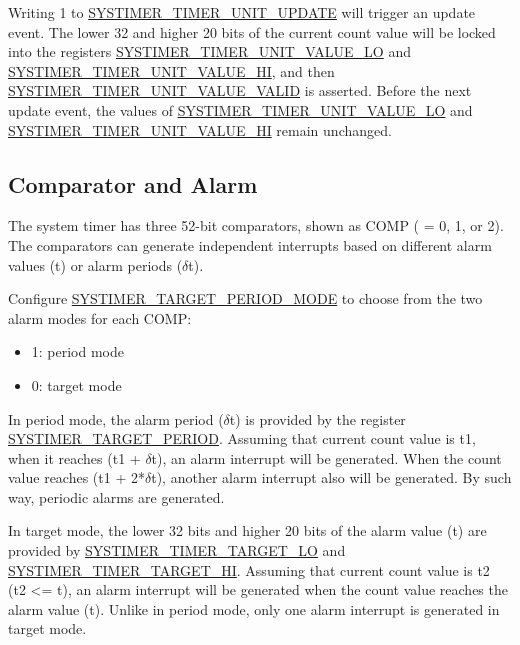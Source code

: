 \documentclass[main\_\_EN.tex]{subfiles}
\begin{document}
Writing 1 to \hyperref[fielddesc:SYSTIMERTIMERUNIT0UPDATE]{SYSTIMER\_TIMER\_UNIT\_UPDATE} will trigger an update event. The lower 32 and higher 20 bits of the current count value will be locked into the registers \hyperref[fielddesc:SYSTIMERTIMERUNIT0VALUELO]{SYSTIMER\_TIMER\_UNIT\_VALUE\_LO} and \hyperref[fielddesc:SYSTIMERTIMERUNIT0VALUEHI]{SYSTIMER\_TIMER\_UNIT\_VALUE\_HI}, and then \hyperref[fielddesc:SYSTIMERTIMERUNIT0VALUEVALID]{SYSTIMER\_TIMER\_UNIT\_VALUE\_VALID} is asserted. Before the next update event, the values of \hyperref[fielddesc:SYSTIMERTIMERUNIT0VALUELO]{SYSTIMER\_TIMER\_UNIT\_VALUE\_LO} and \hyperref[fielddesc:SYSTIMERTIMERUNIT0VALUEHI]{SYSTIMER\_TIMER\_UNIT\_VALUE\_HI} remain unchanged.


\subsection{Comparator and Alarm}
The system timer has three 52-bit comparators, shown as COMP ( = 0, 1, or 2). The comparators can generate independent interrupts based on different alarm values (t) or alarm periods ($\delta$t).

Configure \hyperref[fielddesc:SYSTIMERTARGET0PERIODMODE]{SYSTIMER\_TARGET\_PERIOD\_MODE} to choose from the two alarm modes for each COMP:
\begin{itemize}
    \item 1: period mode
    \item 0: target mode
\end{itemize}

In period mode, the alarm period ($\delta$t) is provided by the register \hyperref[fielddesc:SYSTIMERTARGET2PERIOD]{SYSTIMER\_TARGET\_PERIOD}. Assuming that current count value is t1, when it reaches (t1 + $\delta$t), an alarm interrupt will be generated. When the count value reaches (t1 + 2*$\delta$t), another alarm interrupt also will be generated. By such way, periodic alarms are generated.

In target mode, the lower 32 bits and higher 20 bits of the alarm value (t) are provided by  \hyperref[fielddesc:SYSTIMERTIMERTARGET0LO]{SYSTIMER\_TIMER\_TARGET\_LO} and \hyperref[fielddesc:SYSTIMERTIMERTARGET0HI]{SYSTIMER\_TIMER\_TARGET\_HI}. Assuming that current count value is t2 (t2 <= t), an alarm interrupt will be generated when the count value reaches the alarm value (t). Unlike in period mode, only one alarm interrupt is generated in target mode.
\end{document}
